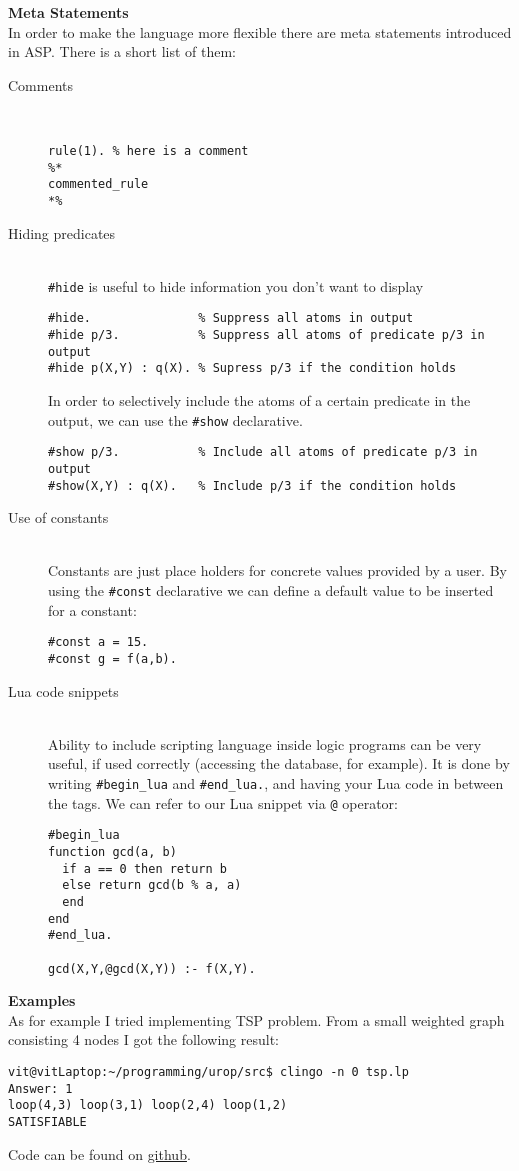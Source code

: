 \documentclass[11pt]{article}
\begin{document}
\textbf{Meta Statements}\\
In order to make the language more flexible there are meta statements introduced in ASP. There is a short list of them:
\begin{description}
  \item[Comments] \hfill \\
  \begin{lstlisting}
rule(1). % here is a comment
%*
commented_rule
*%
  \end{lstlisting}
  \item[Hiding predicates] \hfill \\
  \texttt{\#hide} is useful to hide information you don't want to display
  \begin{lstlisting}
#hide.               % Suppress all atoms in output
#hide p/3.           % Suppress all atoms of predicate p/3 in output
#hide p(X,Y) : q(X). % Supress p/3 if the condition holds
  \end{lstlisting}
  In order to selectively include the atoms of a certain predicate in the output, we can use the \texttt{\#show} declarative.
  \begin{lstlisting}
#show p/3.           % Include all atoms of predicate p/3 in output
#show(X,Y) : q(X).   % Include p/3 if the condition holds
  \end{lstlisting}
  \item[Use of constants] \hfill \\
  Constants are just place holders for concrete values provided by a user. 
  By using the \texttt{\#const} declarative we can define a default value to be
inserted for a constant:
   \begin{lstlisting}
#const a = 15.
#const g = f(a,b).
  \end{lstlisting}
  \item[Lua code snippets] \hfill \\
  Ability to include scripting language inside logic programs can be very useful, 
  if used correctly (accessing the database, for example). 
  It is done by writing \texttt{\#begin\_lua} and \texttt{\#end\_lua.}, 
  and having your Lua code in between the tags. We can refer to our Lua snippet via \texttt{@} operator:
     \begin{lstlisting}
#begin_lua
function gcd(a, b)
  if a == 0 then return b
  else return gcd(b % a, a)
  end
end
#end_lua.

gcd(X,Y,@gcd(X,Y)) :- f(X,Y).
  \end{lstlisting}
\end{description}
\textbf{Examples}\\
As for example I tried implementing TSP problem. From a small weighted graph consisting 4 nodes I got the following result:
\begin{lstlisting}
vit@vitLaptop:~/programming/urop/src$ clingo -n 0 tsp.lp 
Answer: 1
loop(4,3) loop(3,1) loop(2,4) loop(1,2) 
SATISFIABLE
\end{lstlisting}
Code can be found on \href{https://github.com/vitpro/ilp_alp_tal/tree/master/src}{github}.
\end{document}
